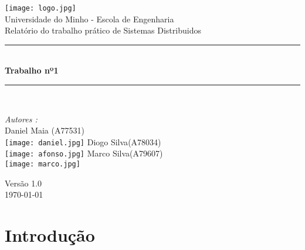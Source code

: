 \documentclass[a4paper]{article}
\begin{document}
\begin{titlepage}
\begin{center}


\texttt{[image: logo.jpg]}\\[0.5cm]

{\large Universidade do Minho - Escola de Engenharia}\\[0.5cm]

{\large Relatório do trabalho prático de Sistemas Distribuidos}\\[0.5cm]

\rule{\linewidth}{0.5mm} \\[0.4cm]
{ \huge \bfseries Trabalho nº1 \\[0.4cm] }
\rule{\linewidth}{0.5mm} \\[1.5cm]

\noindent
\begin{minipage}{0.4\textwidth}
  \begin{flushleft} \large
    \emph{Autores :}\\
    Daniel Maia \textsc{(A77531)}\\
    \texttt{[image: daniel.jpg]}\break
    Diogo Silva\textsc{(A78034)}\\
    \texttt{[image: afonso.jpg]}\break
    Marco Silva\textsc{(A79607)}\\
    \texttt{[image: marco.jpg]}\break
  \end{flushleft}
\end{minipage}%
\vfill

{\large Versão 1.0 \\ \today}

\end{center}
\end{titlepage}




\begin{abstract}

\hspace{3mm} 

\end{abstract}

\pagebreak
\tableofcontents

\pagebreak
\section{Introdução}
\label{sec:1}

\hspace{3mm} 
\end{document}
